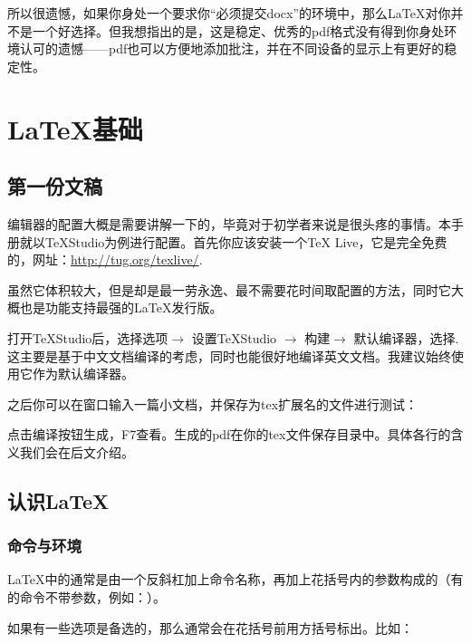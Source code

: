 所以很遗憾，如果你身处一个要求你“必须提交docx”的环境中，那么\LaTeX 对你并不是一个好选择。但我想指出的是，这是稳定、优秀的pdf格式没有得到你身处环境认可的遗憾——pdf也可以方便地添加批注，并在不同设备的显示上有更好的稳定性。

\chapter{\LaTeX{}基础}
\section{第一份文稿}

编辑器的配置大概是需要讲解一下的，毕竟对于初学者来说是很头疼的事情。本手册就以\TeX Studio为例进行配置。首先你应该安装一个\TeX{} Live，它是完全免费的，网址：\url{http://tug.org/texlive/}.

虽然它体积较大，但是却是最一劳永逸、最不需要花时间取配置的方法，同时它大概也是功能支持最强的\LaTeX 发行版。

打开\TeX Studio后，选择选项$\rightarrow$ 设置\TeX Studio $\rightarrow$ 构建$\rightarrow$ 默认编译器，选择\xelatex{}. 这主要是基于中文文档编译的考虑，同时\xelatex 也能很好地编译英文文档。我建议始终使用它作为默认编译器。\dpar

之后你可以在窗口输入一篇小文档，并保存为tex扩展名的文件进行测试：

点击编译按钮生成，F7查看。生成的pdf在你的tex文件保存目录中。具体各行的含义我们会在后文介绍。

\section{认识\LaTeX}
\subsection{命令与环境}
\LaTeX 中的通常是由一个反斜杠加上命令名称，再加上花括号内的参数构成的（有的命令不带参数，例如：）。

如果有一些选项是备选的，那么通常会在花括号前用方括号标出。比如：

